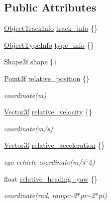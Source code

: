 \subsection*{Public Attributes}
\begin{DoxyCompactItemize}
\item 
\hyperlink{structmaf__perception__interface_1_1ObjectTrackInfo}{Object\+Track\+Info} \hyperlink{structmaf__perception__interface_1_1ADBObjectData_a929e150a184f87e8b99d9fc0db58066b}{track\+\_\+info} \{\}
\item 
\hyperlink{structmaf__perception__interface_1_1ObjectTypeInfo}{Object\+Type\+Info} \hyperlink{structmaf__perception__interface_1_1ADBObjectData_aca45ec13e62265d41986522c3e79a5d8}{type\+\_\+info} \{\}
\item 
\hyperlink{structmaf__perception__interface_1_1Shape3f}{Shape3f} \hyperlink{structmaf__perception__interface_1_1ADBObjectData_addb22efb58cd99de0a4be915587ed44e}{shape} \{\}
\item 
\hyperlink{structmaf__perception__interface_1_1Point3f}{Point3f} \hyperlink{structmaf__perception__interface_1_1ADBObjectData_a0cf0ecdf9fde50b286884e9d360e1084}{relative\+\_\+position} \{\}
\begin{DoxyCompactList}\small\item\em coordinate(m) \end{DoxyCompactList}\item 
\hyperlink{structmaf__perception__interface_1_1Vector3f}{Vector3f} \hyperlink{structmaf__perception__interface_1_1ADBObjectData_a30c52d9746436c9b491fc7ba5b0de95f}{relative\+\_\+velocity} \{\}
\begin{DoxyCompactList}\small\item\em coordinate(m/s) \end{DoxyCompactList}\item 
\hyperlink{structmaf__perception__interface_1_1Vector3f}{Vector3f} \hyperlink{structmaf__perception__interface_1_1ADBObjectData_a32df009730d011c0fee72913572d8a93}{relative\+\_\+acceleration} \{\}
\begin{DoxyCompactList}\small\item\em ego-\/vehicle coordinate(m/s$^\wedge$2) \end{DoxyCompactList}\item 
float \hyperlink{structmaf__perception__interface_1_1ADBObjectData_a40449c2ea82629a30148b20e8d26fd29}{relative\+\_\+heading\+\_\+yaw} \{\}
\begin{DoxyCompactList}\small\item\em coordinate(rad, range\+:-\/2$\ast$pi$\sim$2$\ast$pi) \end{DoxyCompactList}\item 

\end{DoxyCompactItemize}
